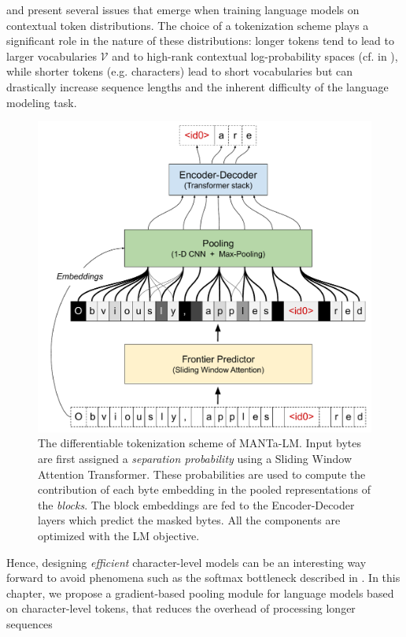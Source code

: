 \newcommand{\rs}{$\!${\color{red}|}$\!$} %
\newcommand{\nors}{$\!${\color{white}|}$\!$} %


 and  present several issues that emerge when training language models on contextual token distributions. The choice of a tokenization scheme plays a significant role in the nature of these distributions: longer tokens tend to lead to larger vocabularies $\mathcal{V}$ and to high-rank contextual log-probability spaces (cf.  in ), while shorter tokens (e.g. characters) lead to short vocabularies but can drastically increase sequence lengths and the inherent difficulty of the language modeling task.
\begin{figure}[!b]
    \centering
    \includegraphics[width=0.6\linewidth]{sources/part_2/manta/images/full_difftok_schema.pdf}
    \caption{The differentiable tokenization scheme of MANTa-LM. Input bytes are first assigned a \textit{separation probability} using a Sliding Window Attention Transformer. These probabilities are used to compute the contribution of each byte embedding in the pooled representations of the \textit{blocks}. The block embeddings are fed to the Encoder-Decoder layers which predict the masked bytes. All the components are optimized with the LM objective.}
    \label{fig:overview_diagram}
\end{figure}

Hence, designing \textit{efficient} character-level models can be an interesting way forward to avoid phenomena such as the softmax bottleneck described in . In this chapter, we propose a gradient-based pooling module for language models based on character-level tokens, that reduces the overhead of processing longer sequences 

